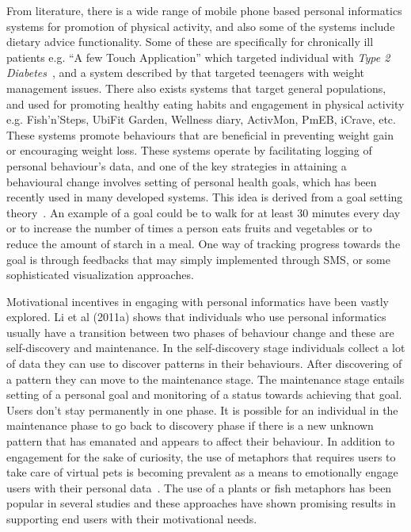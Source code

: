 From literature, there is a wide range of mobile phone based personal informatics systems for promotion of physical activity, and also some of the systems include dietary advice functionality. Some of these are specifically for chronically ill patients e.g. ``A few Touch Application'' which targeted individual with  \emph{Type 2 Diabetes}~\citep{arsand:mobile}, and a system described by \cite{arteaga2010:persuasive} that targeted teenagers with weight management issues. There also exists systems that target general populations, and used for promoting healthy eating habits and engagement in physical activity e.g. Fish'n'Steps\citep{lin2006:fish}, UbiFit Garden\citep{klasnja2009:using}, Wellness diary\citep{mattila2008mobile}, ActivMon\citep{burns2012using}, PmEB\citep{lee2006pmeb}, iCrave\citep{hsu2014persuasive}, etc.  These systems promote behaviours that are beneficial in preventing weight gain or encouraging weight loss. These systems operate by facilitating logging of personal behaviour’s data, and one of the key strategies in attaining a behavioural change involves setting of personal health goals, which has been recently used in many developed systems. This idea is derived from a goal setting theory~\citep{strecher1995goal}. An example of a goal could be to walk for at least 30 minutes every day or to increase the number of times a person eats fruits and vegetables or to reduce the amount of starch in a meal. One way of tracking progress towards the goal is through feedbacks that may simply implemented through SMS, or some sophisticated visualization approaches.

Motivational incentives in engaging with personal informatics have been vastly explored. Li et al (2011a) shows that individuals who use personal informatics usually have a transition between two phases of behaviour change and these are self-discovery and maintenance. In the self-discovery stage individuals collect a lot of data they can use to discover patterns in their behaviours. After discovering of a pattern they can move to the maintenance stage. The maintenance stage entails setting of a personal goal and monitoring of a status towards achieving that goal. Users don't stay permanently in one phase. It is possible for an individual in the maintenance phase to go back to discovery phase if there is a new unknown pattern that has emanated and appears to affect their behaviour. In addition to engagement for the sake of curiosity, the use of metaphors that requires users to take care of virtual pets is becoming prevalent as a means to emotionally engage users with their personal data~\citep{lin2006:fish,albaina2009flowie,klasnja2009:using,pollak2010s,nakajima2013designing}. The use of a plants or fish metaphors has been popular in several studies and these approaches have shown promising results in supporting end users with their motivational needs.


